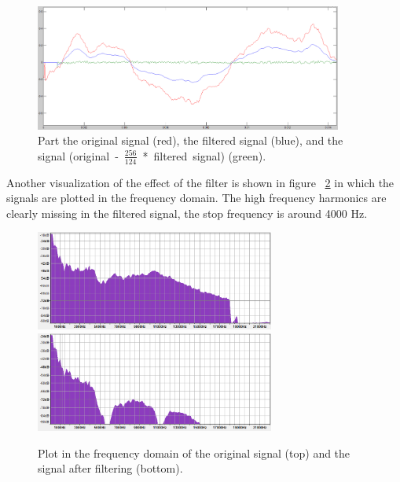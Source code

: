 \begin{figure}
\begin{center}
\includegraphics[width=0.9\textwidth]{images/diff.png}
\caption{Part the original signal (red), the filtered signal (blue), and the signal \mbox{(original - $\frac{256}{124}$ * filtered signal)} (green).}
\label{fig:diff}
\end{center}
\end{figure}

Another visualization of the effect of the filter is shown in figure  ~\ref{fig:spectrum} in which the signals are plotted in the frequency domain. The high frequency harmonics are clearly missing in the filtered signal, the stop frequency is around 4000 Hz. 

\begin{figure}
\begin{center}
\includegraphics[width=0.7\textwidth]{images/spectrum_input.png}
\includegraphics[width=0.7\textwidth]{images/spectrum_output.png}
\caption{Plot in the frequency domain of the original signal (top) and the signal after filtering (bottom).}
\label{fig:spectrum}
\end{center}
\end{figure}


\FloatBarrier
